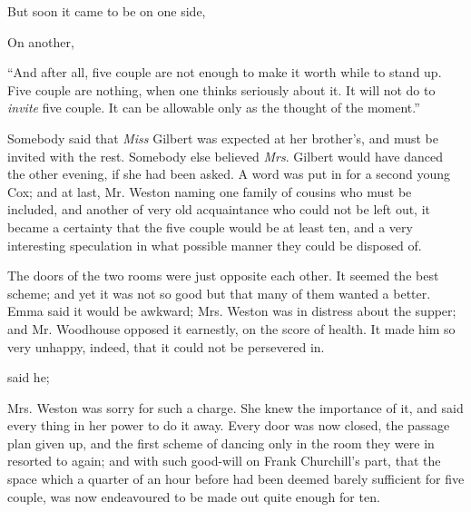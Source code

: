But soon it came to be on one side,


On another,

“And after all, five couple are not enough to make it worth while to stand up. Five couple are nothing, when one thinks seriously about it. It will not do to {\em invite} five couple. It can be allowable only as the thought of the moment.”

Somebody said that {\em Miss} Gilbert was expected at her brother's, and must be invited with the rest. Somebody else believed {\em Mrs}. Gilbert would have danced the other evening, if she had been asked. A word was put in for a second young Cox; and at last, Mr. Weston naming one family of cousins who must be included, and another of very old acquaintance who could not be left out, it became a certainty that the five couple would be at least ten, and a very interesting speculation in what possible manner they could be disposed of.

The doors of the two rooms were just opposite each other.  It seemed the best scheme; and yet it was not so good but that many of them wanted a better. Emma said it would be awkward; Mrs. Weston was in distress about the supper; and Mr. Woodhouse opposed it earnestly, on the score of health. It made him so very unhappy, indeed, that it could not be persevered in.

 said he; 

Mrs. Weston was sorry for such a charge. She knew the importance of it, and said every thing in her power to do it away. Every door was now closed, the passage plan given up, and the first scheme of dancing only in the room they were in resorted to again; and with such good-will on Frank Churchill's part, that the space which a quarter of an hour before had been deemed barely sufficient for five couple, was now endeavoured to be made out quite enough for ten.

